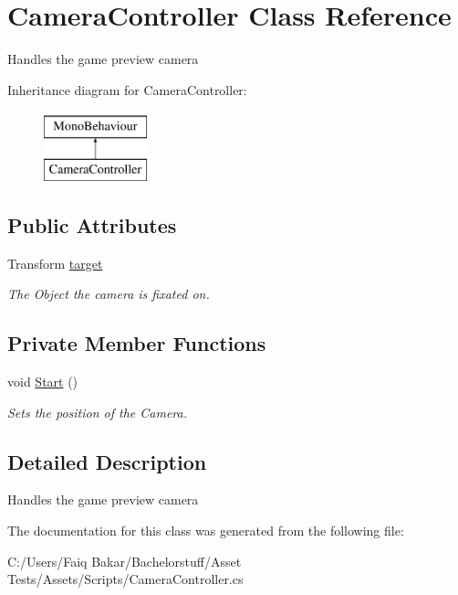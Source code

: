 \hypertarget{class_camera_controller}{}\section{Camera\+Controller Class Reference}
\label{class_camera_controller}


Handles the game preview camera  


Inheritance diagram for Camera\+Controller\+:\begin{figure}[H]
\begin{center}
\leavevmode
\includegraphics[height=2.000000cm]{class_camera_controller}
\end{center}
\end{figure}
\subsection*{Public Attributes}
\begin{DoxyCompactItemize}
\item 
\mbox{\label{class_camera_controller_a0a48b454b4a2bb8dbfc08e64b8c3e8e6}} 
Transform \mbox{\hyperlink{class_camera_controller_a0a48b454b4a2bb8dbfc08e64b8c3e8e6}{target}}
\begin{DoxyCompactList}\small\item\em The Object the camera is fixated on. \end{DoxyCompactList}\end{DoxyCompactItemize}
\subsection*{Private Member Functions}
\begin{DoxyCompactItemize}
\item 
\mbox{\label{class_camera_controller_ad4a238c6f7db3ee003302a245d860860}} 
void \mbox{\hyperlink{class_camera_controller_ad4a238c6f7db3ee003302a245d860860}{Start}} ()
\begin{DoxyCompactList}\small\item\em Sets the position of the Camera. \end{DoxyCompactList}\end{DoxyCompactItemize}


\subsection{Detailed Description}
Handles the game preview camera 



The documentation for this class was generated from the following file\+:\begin{DoxyCompactItemize}
\item 
C\+:/\+Users/\+Faiq Bakar/\+Bachelorstuff/\+Asset Tests/\+Assets/\+Scripts/Camera\+Controller.\+cs\end{DoxyCompactItemize}
